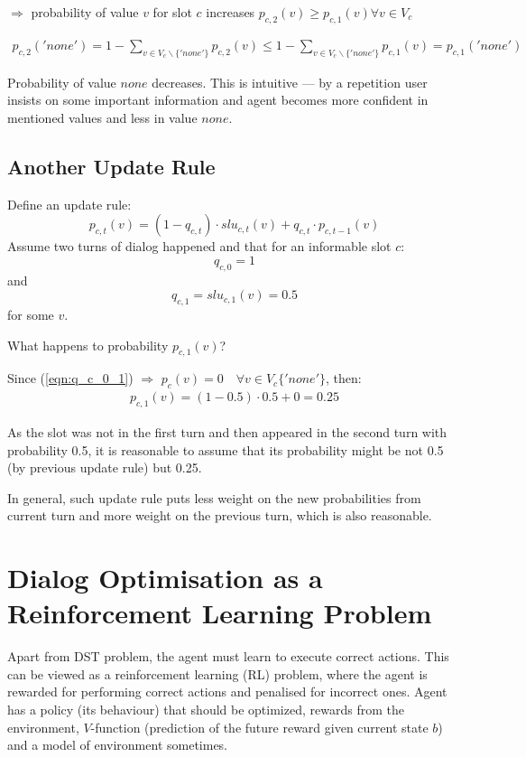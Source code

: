 \documentclass[12pt,titlepage,a4paper]{article}
\begin{document}
\noindent $\Rightarrow$ probability of value $v$  for slot $c$ increases $p_{c,2}(v) \geq p_{c,1}(v) \forall v \in V_c $

\begin{align*}
    p_{c,2}('none') = 1 - \sum_{v \in V_{c} \backslash \{'none'\}} p_{c,2}(v) \leq 1 - \sum_{v \in V_{c} \backslash \{'none'\}} p_{c,1}(v)  = p_{c,1}('none')
\end{align*}

\noindent Probability of value $none$ decreases.
This is intuitive --- by a repetition user insists on some important information and agent becomes more confident in mentioned values and less in value $none$.

\subsection{Another Update Rule}
Define an update rule:
\begin{equation}
    p_{c,t}(v) = (1-q_{c,t})\cdot slu_{c,t}(v) + q_{c,t} \cdot p_{c,t-1}(v)
\end{equation}
Assume two turns of dialog happened and that for an informable slot $c$:
\begin{equation}
    \label{eqn:q_c_0_1}
    q_{c, 0} = 1
\end{equation}
and 
\begin{equation}
    \label{eqn:q_c_1}
    q_{c, 1} = slu_{c,1}(v) = 0.5
\end{equation}
for some $v$.

What happens to probability $p_{c,1}(v)$?

Since (\ref{eqn:q_c_0_1}) $\Rightarrow$ $p_c(v) = 0  \quad \forall v \in V_c\{'none'\} $, then: 
\begin{align*}
    p_{c,1}(v) = (1 - 0.5) \cdot 0.5 + 0 = 0.25
\end{align*}

As the slot was not in the first turn and then appeared in the second turn with probability 0.5, it is reasonable to assume that its probability might be not 0.5 (by previous update rule) but 0.25. 

In general, such update rule puts less weight on the new probabilities from current turn and more weight on the previous turn, which is also reasonable. 

\newpage

\section{Dialog Optimisation as a Reinforcement Learn\-ing Problem}
Apart from DST problem, the agent must learn to execute correct actions. This can be viewed as a reinforcement learning (RL) problem, where the agent is rewarded for performing correct actions and penalised for incorrect ones. Agent has a policy (its behaviour) that should be optimized, rewards from the environment, $V$-function (prediction of the future reward given current state $b$) and a model of environment sometimes.
\end{document}
